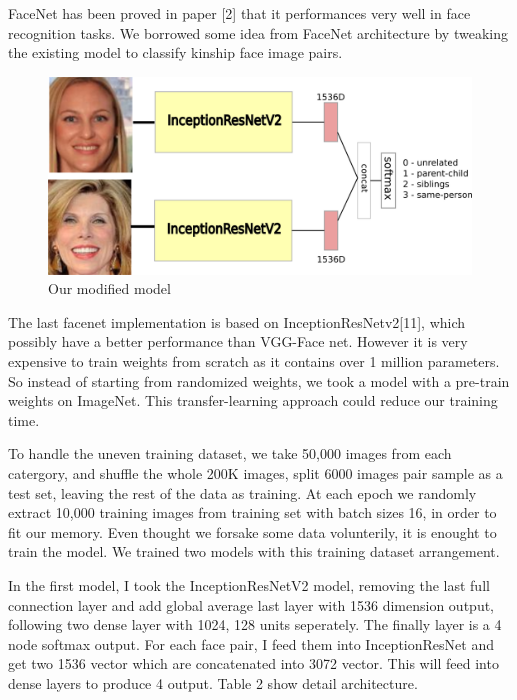 \documentclass{article}
\begin{document}
FaceNet has been proved in paper [2] that it performances very well in face
recognition tasks. We borrowed some idea from FaceNet architecture by tweaking
the existing model to classify kinship face image pairs.

\begin{figure}[h]
	\caption{Our modified model}
	\includegraphics[width=1\textwidth]{img/model_pic1}
	\centering
\end{figure}

The last facenet implementation is based on InceptionResNetv2[11], which
possibly have a better performance than VGG-Face net. However it is very
expensive to train weights from scratch as it contains over 1 million
parameters. So instead of starting from randomized weights, we took a model
with a pre-train weights on ImageNet. This transfer-learning approach could
reduce our training time.

To handle the uneven training dataset, we take 50,000 images from each
catergory, and shuffle the whole 200K images, split 6000 images pair sample as
a test set, leaving the rest of the data as training. At each epoch we randomly
extract 10,000 training images from training set with batch sizes 16, in order
to fit our memory.  Even thought we forsake some data volunterily, it is
enought to train the model. We trained two models with this training dataset
arrangement.

In the first model, I took the InceptionResNetV2 model, removing the last full
connection layer and add global average last layer with 1536 dimension output,
following two dense layer with 1024, 128 units seperately. The finally layer is
a 4 node softmax output. For each face pair, I feed them into InceptionResNet
and get two 1536 vector which are concatenated into 3072 vector. This will feed
into dense layers to produce 4 output. Table 2 show detail architecture.
\end{document}
